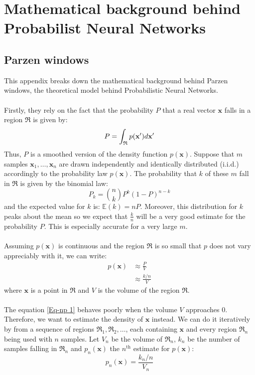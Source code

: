 \chapter{Mathematical background behind Probabilist Neural Networks} \label{Appendix: Parzen/math-background}

\section{Parzen windows}
This appendix breaks down the mathematical background behind Parzen windows, the theoretical model behind Probabilistic Neural Networks. 
\\ \\
Firstly, they rely on the fact that the probability $P$ that a real vector $\mathbf{x}$ falls in a region $\mathfrak{R}$ is given by:
\begin{equation}
\centering
P = \int_{\mathfrak{R}} p(\mathbf{x'}) d\mathbf{x'}
\end{equation}
Thus, $P$ is a smoothed version of the density function $p(\mathbf{x})$. Suppose that $m$ samples $\mathbf{x}_1,\dots ,\mathbf{x}_n$ are drawn independently and identically distributed (i.i.d.) accordingly to the probability law $p(\mathbf{x})$. The probability that $k$ of these $m$ fall in $\mathfrak{R}$ is given by the binomial law:
\begin{equation}
P_k = {n\choose k} P^k (1-P)^{n-k}
\end{equation}
and the expected value for $k$ is: $\mathbb{E}(k) = nP$. Moreover, this distribution for $k$ peaks about the mean so we expect that $\frac{k}{n}$ will be a very good estimate for the probability $P$. This is especially accurate for a very large $m$. 
\\ \\
Assuming $p(\mathbf{x})$ is continuous and the region $\mathfrak{R}$ is so small that $p$ does not vary appreciably with it, we can write:
\begin{equation}
\begin{split}
p(\mathbf{x}) &\approx \frac{P}{V} \\
&\approx \frac{k / n}{V}
\end{split}	
\label{Eq-np 1}
\end{equation}
where $\mathbf{x}$ is a point in $\mathfrak{R}$ and $V$ is the volume of the region $\mathfrak{R}$.
\\ \\
The equation \ref{Eq-np 1} behaves poorly when the volume $V$ approaches 0. Therefore, we want to estimate the density of $\mathbf{x}$ instead. We can do it iteratively by from a sequence of regions $\mathfrak{R}_1, \mathfrak{R}_2, \dots$, each containing $\mathbf{x}$ and every region $\mathfrak{R}_n$ being used with $n$ samples. Let $V_n$ be the volume of $\mathfrak{R}_n$, $k_n$ be the number of samples falling in $\mathfrak{R}_n$ and $p_n(\mathbf{x})$ the $n^\text{th}$ estimate for $p(\mathbf{x})$:
\begin{equation}
p_n(\mathbf{x}) = \frac{k_n/n}{V_n}
\label{Eq-np 2}
\end{equation}

